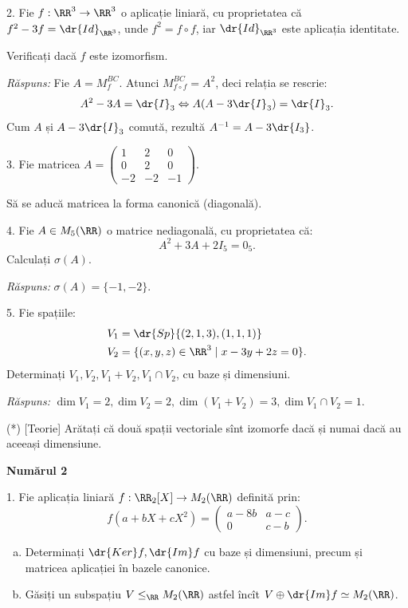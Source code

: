 \vspace{1cm}

2. Fie $ f : \RR^3 \to \RR^3 $ o aplicație liniară, cu proprietatea că
$ f^2 - 3f = \dr{Id}_{\RR^3} $, unde $ f^2 = f \circ f $, iar
$ \dr{Id}_{\RR^3} $ este aplicația identitate.

Verificați dacă $ f $ este izomorfism.

\emph{Răspuns:} Fie $ A = M_f^{BC} $. Atunci $ M_{f \circ f}^{BC} = A^2 $, deci
relația se rescrie:
\[
  A^2 - 3A = \dr{I}_3 \Leftrightarrow A(A - 3\dr{I}_3) = \dr{I}_3.
\]
Cum $ A $ și $ A - 3\dr{I}_3$ comută, rezultă $ A^{-1} = A - 3 \dr{I_3} $.

\vspace{1cm}

3. Fie matricea $ A = \begin{pmatrix} 1 & 2 & 0 \\ 0 & 2 & 0 \\ -2 & -2 & -1 \end{pmatrix} $.

Să se aducă matricea la forma canonică (diagonală).

\vspace{1cm}

4. Fie $ A \in M_5(\RR) $ o matrice nediagonală, cu proprietatea că:
\[
  A^2 + 3A + 2 I_5 = 0_5.
\]
Calculați $ \sigma(A) $.

\emph{Răspuns:} $ \sigma(A) = \{ -1, -2 \} $.

\vspace{1cm}

5. Fie spațiile:
\begin{align*}
  V_1 &= \dr{Sp} \{(2, 1, 3), (1, 1, 1) \} \\
  V_2 &= \{(x, y, z) \in \RR^3 \mid x - 3y + 2z = 0 \}.
\end{align*}
Determinați $ V_1, V_2, V_1 + V_2, V_1 \cap V_2 $, cu baze și dimensiuni.

\emph{Răspuns:} $ \dim V_1 = 2, \dim V_2 = 2, \dim(V_1 + V_2) = 3, \dim V_1 \cap V_2 = 1 $.

\vspace{1cm}

(*) [Teorie] Arătați că două spații vectoriale sînt izomorfe dacă și numai dacă au
aceeași dimensiune.

\vspace{1cm}

\textbf{Numărul 2}

1. Fie aplicația liniară $ f : \RR_2[X] \to M_2(\RR) $ definită prin:
\[
  f(a + bX + cX^2) = %
  \begin{pmatrix}
    a - 8b & a - c \\
    0 & c - b
  \end{pmatrix}.
\]
\begin{enumerate}[(a)]
\item Determinați $ \dr{Ker} f, \dr{Im}f $ cu baze și dimensiuni, precum și
  matricea aplicației în bazele canonice.
\item Găsiți un subspațiu $ V \leq_\RR M_2(\RR) $ astfel încît
  $ V \oplus \dr{Im} f \simeq M_2(\RR) $.
\end{enumerate}

